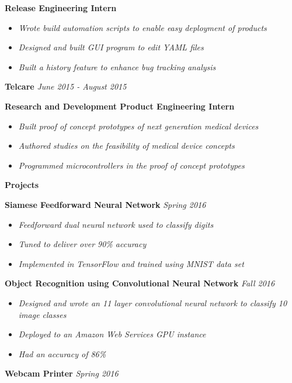 \documentclass[8pt]{extarticle}
\begin{document}
\textbf{Release Engineering Intern } 
\begin{itemize}
\item \textit{Wrote build automation scripts to enable easy deployment of products}
\item \textit{Designed and built GUI program to edit YAML files}
\item \textit{Built a history feature to enhance bug tracking analysis}

\end{itemize}
\textbf{Telcare} \textit{June  2015 - August 2015}

\textbf{Research and Development Product Engineering Intern} 
\begin{itemize}
\item \textit{Built proof of concept prototypes of next generation medical devices}
\item \textit{Authored studies on the feasibility of medical device concepts}
\item \textit{Programmed microcontrollers in the proof of concept prototypes}

\end{itemize}
\begin{changemargin}{-0.8cm}{0.0cm}
\textbf{Projects}
\end{changemargin}
\vspace*{-0.4cm}
\makebox[\linewidth]{\rule{17cm}{0.4pt}}
\textbf{Siamese Feedforward Neural Network}  \textit{Spring 2016}

\begin{itemize}
\item \textit{Feedforward dual neural network used to classify digits}
\item \textit{Tuned to deliver over 90\% accuracy}
\item \textit{Implemented in TensorFlow and trained using MNIST data set}

\end{itemize}
\textbf{Object Recognition using Convolutional Neural Network}  \textit{Fall 2016}

\begin{itemize}
\item \textit{Designed and wrote an 11 layer convolutional neural network to classify 10 image classes}
\item \textit{Deployed to an Amazon Web Services GPU instance}
\item \textit{Had an accuracy of 86\%}

\end{itemize}
\textbf{Webcam Printer}  \textit{Spring 2016}
\end{document}
